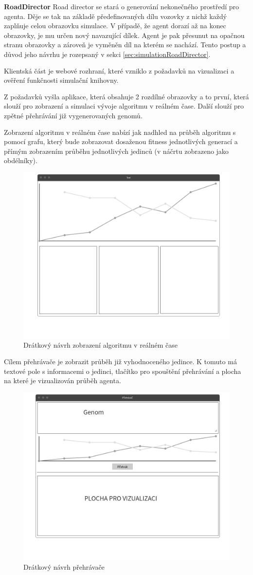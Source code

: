 \textbf{RoadDirector} Road director se stará o generování nekonečného prostředí pro agenta. Děje se tak na základě předefinovaných dílu vozovky z nichž každý zaplňuje celou obrazovku simulace. V případě, že agent dorazí až na konec obrazovky, je mu určen nový navazující dílek. Agent je pak přesunut na opačnou stranu obrazovky a zároveň je vyměněn díl na kterém se nachází. Tento postup a důvod jeho návrhu je rozepsaný v sekci \ref{sec:simulationRoadDirector}.

Klientská část je webové rozhraní, které vzniklo z požadavků na vizualizaci a ověření funkčnosti simulační knihovny. 

Z požadavků vyšla aplikace, která obsahuje 2 rozdílné obrazovky a to první, která slouží pro zobrazení a simulaci vývoje algoritmu v reálném čase. Další slouží pro zpětné přehrávání již vygenerovaných genomů.

Zobrazení algoritmu v reálném čase nabízí jak nadhled na průběh algoritmu s pomocí grafu, který bude zobrazovat dosaženou fitness jednotlivých generací a přímým zobrazením průběhu jednotlivých jedinců (v náčrtu zobrazeno jako obdélníky).
\begin{figure}[H]
	\centering
	\includegraphics[width=0.6\linewidth]{wireframe/main}
	\caption{Drátkový návrh zobrazení algoritmu v reálném čase}
	\label{fig:main}
\end{figure}

Cílem přehrávače je zobrazit průběh již vyhodnoceného jedince. K tomuto má textové pole s informacemi o jedinci, tlačítko pro spouštění přehrávání a plocha na které je vizualizován průběh agenta.
\begin{figure}[H]
	\centering
	\includegraphics[width=0.6\linewidth]{wireframe/player}
	\caption{Drátkový návrh přehrávače}
	\label{fig:player}
\end{figure}


